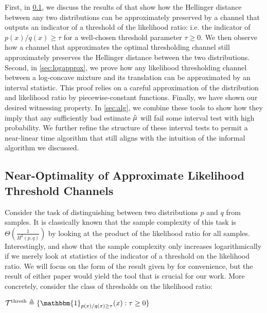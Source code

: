 First, in \cref{sec:approxchannel}, we discuss the results of \cite{bhatt2021information,pensia2023communication} that show how the Hellinger distance between any two distributions can be approximately preserved by a channel that outputs an indicator of a threshold of the likelihood ratio: i.e. the indicator of $p(x)/q(x) \ge \tau$ for a well-chosen threshold parameter $\tau \ge 0$. We then observe how a channel that approximates the optimal thresholding channel still approximately preserves the Hellinger distance between the two distributions. Second, in \cref{sec:logapprox}, we prove how any likelihood thresholding channel between a log-concave mixture and its translation can be approximated by an interval statistic. This proof relies on a careful approximation of the distribution and likelihood ratio by piecewise-constant functions. Finally, we have shown our desired witnessing property. In \cref{sec:alg}, we combine these tools to show how they imply that any sufficiently bad estimate $\hat{\mu}$ will fail some interval test with high probability. We further refine the structure of these interval tests to permit a near-linear time algorithm that still aligns with the intuition of the informal algorithm we discussed.

\subsection{Near-Optimality of Approximate Likelihood Threshold Channels}\label{sec:approxchannel}
Consider the task of distinguishing between two distributions $p$ and $q$ from samples. It is classically known that the sample complexity of this task is $\Theta(\frac{1}{H^2(p,q)})$ by looking at the product of the likelihood ratio for all samples. Interestingly, \cite{bhatt2021information} and \cite{pensia2023communication} show that the sample complexity only increases logarithmically if we merely look at statistics of the indicator of a threshold on the likelihood ratio. We will focus on the form of the result given by \cite{pensia2023communication} for convenience, but the result of either paper would yield the tool that is crucial for our work. More concretely, consider the class of thresholds on the likelihood ratio:

\begin{definition}
    $\mathcal{T}^{\operatorname{thresh}} \triangleq \{\mathbbm{1}_{p(x)/q(x) \ge \tau}(x) : \tau \ge 0 \}$
\end{definition}


